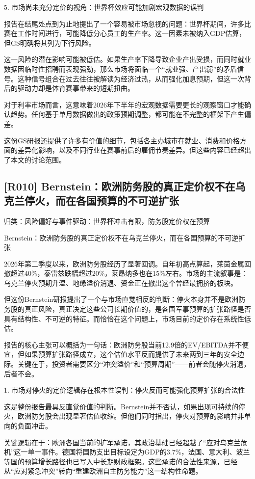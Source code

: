 \documentclass[11pt]{ctexart}
\begin{document}
5. 市场尚未充分定价的视角：世界杯效应可能加剧宏观数据的误判

报告在结尾处点到为止地提出了一个容易被市场忽视的问题：世界杯期间，许多比赛在工作时间进行，可能降低分心员工的生产率。这一因素未被纳入GDP估算，但GS明确将其列为下行风险。

这一风险的潜在影响可能被低估。如果生产率下降导致企业产出受损，而同时就业数据因临时性招聘而表现强劲，那么市场将面临一个“就业强、产出弱”的矛盾信号。这种信号组合在过去往往被解读为经济过热，从而强化加息预期，但这一次背后的驱动力却是体育赛事带来的短期扭曲。

对于利率市场而言，这意味着2026年下半年的宏观数据需要更长的观察窗口才能确认趋势。任何基于单月数据做出的政策预期调整，都可能在不完整的框架下产生偏差。

这份GS研报还提供了许多有价值的细节，包括各主办城市在就业、消费和价格方面的差异化影响，以及不同行业在赛事前后的雇佣节奏差异。但这些内容已经超出了本文的讨论范围。

\subsection{[R010] Bernstein：欧洲防务股的真正定价权不在乌克兰停火，而在各国预算的不可逆扩张}
{\small\color{refgray}归类：风险偏好与事件驱动：世界杯冲击有限，防务股定价权在预算}

Bernstein：欧洲防务股的真正定价权不在乌克兰停火，而在各国预算的不可逆扩张

2026年第二季度以来，欧洲防务股经历了显著回调。自年初高点算起，莱茵金属回撤超过40\%，泰雷兹跌幅超过20\%，莱昂纳多也在15\%左右。市场的主流叙事是：乌克兰停火预期升温、地缘溢价消退、资金正在撤出这个曾经最拥挤的板块。

但这份Bernstein研报提出了一个与市场直觉相反的判断：停火本身并不是欧洲防务股的真正风险，真正决定这些公司长期价值的，是各国军事预算的扩张路径是否具有结构性、不可逆的特征。而恰恰在这个问题上，市场目前的定价存在系统性低估。

报告的核心主张可以概括为一句话：欧洲防务股当前12.9倍的EV/EBITDA并不便宜，但如果预算扩张路径成立，这个估值水平反而提供了未来两到三年的安全边际。关键在于，投资者需要区分“冲突溢价”和“预算周期”——前者会随停火消退，后者不会。

1. 市场对停火的定价逻辑存在根本性误判：停火反而可能强化预算扩张的合法性

这是整份报告最具反直觉价值的判断。Bernstein并不否认，如果出现可持续的停火，欧洲防务股会出现显著估值收缩。但他们同时指出，停火对预算的影响并非单向的负面冲击。

关键逻辑在于：欧洲各国当前的扩军承诺，其政治基础已经超越了“应对乌克兰危机”这一单一事件。德国将国防支出目标设定为GDP的3.7\%，法国、意大利、波兰等国的预算增长路径也已写入中长期财政框架。这些承诺的合法性来源，已经从“应对紧急冲突”转向“重建欧洲自主防务能力”这一结构性命题。
\end{document}
